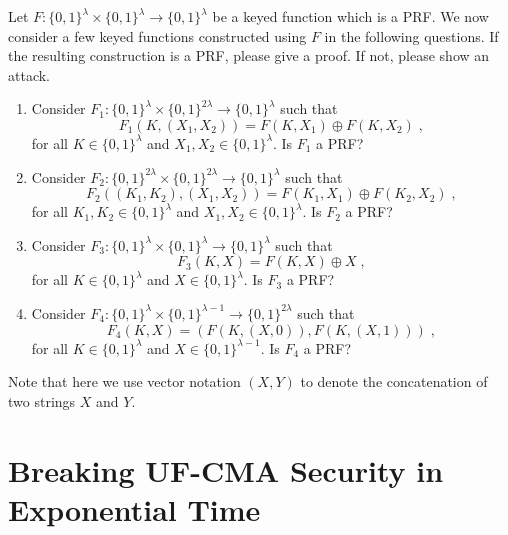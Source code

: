 \documentclass[11pt]{article}
\newcommand{\bits}{\{0,1\}}
\theoremstyle{plain}
\theoremstyle{definition}
\begin{document}
 \noindent Let $F: \bits^\lambda \times \bits^\lambda \to
 \bits^\lambda$ be a keyed function which is a
 PRF. We now consider a few keyed functions constructed using $F$ in
 the following questions. If the resulting construction is a PRF, please give a proof. If not, please show an attack.
 \begin{enumerate}
 \item  Consider $F_1: \bits^\lambda \times
   \bits^{2\lambda} \to \bits^{\lambda}$ such that
   \begin{displaymath}
     F_1(K, (X_1, X_2)) = F(K, X_1) \oplus F(K, X_2) \;,
   \end{displaymath}
   for all $K \in \bits^{\lambda}$ and $X_1, X_2 \in \bits^\lambda$. Is $F_1$ a PRF?
 \item Consider $F_2: \bits^{2\lambda} \times
   \bits^{2\lambda} \to \bits^{\lambda}$ such that
   \begin{displaymath}
     F_2((K_1, K_2), (X_1, X_2)) = F(K_1, X_1) \oplus F(K_2, X_2) \;,
   \end{displaymath}
   for all $K_1,K_2 \in \bits^\lambda$ and $X_1, X_2 \in \bits^\lambda$. Is $F_2$ a
   PRF?
  \item Consider $F_3: \bits^\lambda \times
   \bits^\lambda \to \bits^\lambda$ such that
   \begin{displaymath}
     F_3(K, X) = F(K, X) \oplus X \;,
   \end{displaymath}
   for all $K \in \bits^\lambda$ and $X \in \bits^\lambda$. Is $F_3$ a PRF?
   \item Consider $F_4: \bits^\lambda \times
   \bits^{\lambda-1} \to \bits^{2\lambda}$ such that
   \begin{displaymath}
     F_4(K, X) = (F(K, (X,0)), F(K, (X, 1))) \;,
   \end{displaymath}
   for all $K \in \bits^\lambda$ and $X \in \bits^{\lambda - 1}$. Is $F_4$ a PRF?
 \end{enumerate}
Note that here we use vector notation $(X,Y)$ to denote the
concatenation of two strings $X$ and $Y$.

\newpage


\newcommand{\advG}{\mathcal{G}}
\newcommand{\Eval}{\mathbf{E}}
\newcommand{\ks}{\mathcal{K}}
\newcommand{\ms}{\mathcal{X}}
\newcommand{\os}{\mathcal{Y}}
\newcommand{\leftkeys}{\mathsf{Keys}}
\newcommand{\farkeys}{\mathsf{FarKeys}}
\newcommand{\diff}{\mathsf{Diff}}

\section*{Breaking UF-CMA
    Security in Exponential Time}
\end{document}
